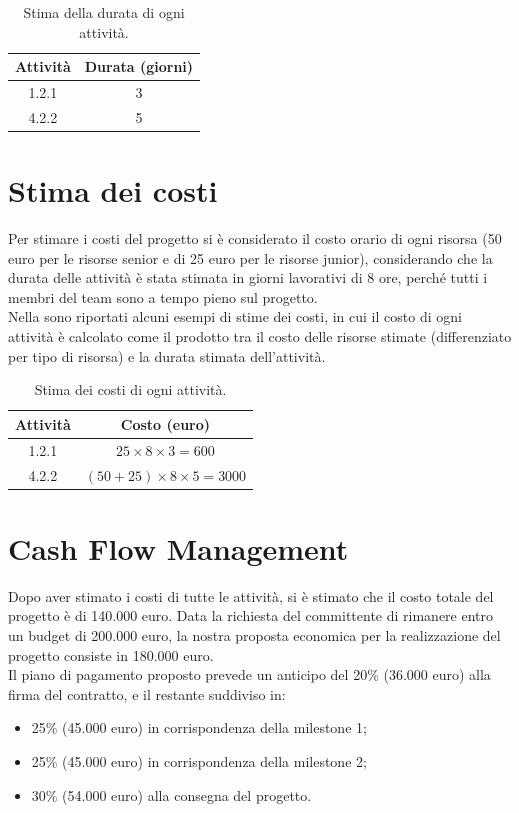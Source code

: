 \documentclass[a4paper,12pt]{article}
\begin{document}
\begin{table}[!htb]
    \centering
    \begin{tabular}{|c|c|}
        \hline
        \textbf{Attività} & \textbf{Durata (giorni)} \\
        \hline
        1.2.1    & 3  \\
        \hline
        4.2.2    & 5  \\
        \hline
    \end{tabular}
    \caption{Stima della durata di ogni attività.}
    \label{table:duration_estimated}
\end{table}

\section{Stima dei costi}
Per stimare i costi del progetto si è considerato il costo orario di ogni risorsa (50 euro per le risorse senior e di
25 euro per le risorse junior), considerando che la durata delle attività è stata stimata in giorni lavorativi di 8
ore, perché tutti i membri del team sono a tempo pieno sul progetto. \\
Nella  sono riportati alcuni esempi di stime dei costi, in cui il costo di ogni attività è
calcolato come il prodotto tra il costo delle risorse stimate (differenziato per tipo di risorsa) e la durata stimata
dell'attività.

\begin{table}[!htb]
    \centering
    \begin{tabular}{|c|c|}
        \hline
        \textbf{Attività} & \textbf{Costo (euro)} \\
        \hline
        1.2.1    & $25 \times 8 \times 3 = 600$  \\
        \hline
        4.2.2    & $(50 + 25) \times 8 \times 5 = 3000$  \\
        \hline
    \end{tabular}
    \caption{Stima dei costi di ogni attività.}
    \label{table:cost_estimated}
\end{table}

\section{Cash Flow Management}
Dopo aver stimato i costi di tutte le attività, si è stimato che il costo totale del progetto è di 140.000 euro.
Data la richiesta del committente di rimanere entro un budget di 200.000 euro, la nostra proposta economica per la
realizzazione del progetto consiste in 180.000 euro. \\
Il piano di pagamento proposto prevede un anticipo del 20\% (36.000 euro) alla firma del contratto, e il restante
suddiviso in:
\begin{itemize}
    \item 25\% (45.000 euro) in corrispondenza della milestone 1;
    \item 25\% (45.000 euro) in corrispondenza della milestone 2;
    \item 30\% (54.000 euro) alla consegna del progetto.
\end{itemize}
\end{document}
